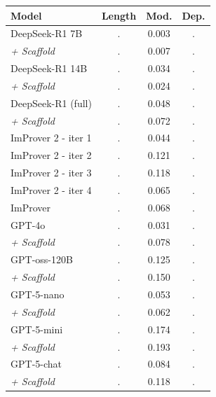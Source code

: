 \begin{tabular}{l|ccc}
\hline
\textbf{Model}  & \textbf{Length} & \textbf{Mod.} & \textbf{Dep.} \\
\hline
DeepSeek-R1 7B & . & 0.003 & . \\
\textit{+ Scaffold} & . & 0.007 & . \\
DeepSeek-R1 14B & . & 0.034 & . \\
\textit{+ Scaffold} & . & 0.024 & . \\
DeepSeek-R1 (full) & . & 0.048 & . \\
\textit{+ Scaffold} & . & 0.072 & . \\
\hdashline
ImProver 2 - iter 1 & . & 0.044 & . \\
ImProver 2 - iter 2 & . & 0.121 & . \\
ImProver 2 - iter 3 & . & 0.118 & . \\
ImProver 2 - iter 4 & . & 0.065 & . \\
\hdashline
ImProver & . & 0.068 & . \\
GPT-4o & . & 0.031 & . \\
\textit{+ Scaffold} & . & 0.078 & . \\
\hdashline
GPT-oss-120B & . & 0.125 & . \\
\textit{+ Scaffold} & . & 0.150 & . \\
GPT-5-nano & . & 0.053 & . \\
\textit{+ Scaffold} & . & 0.062 & . \\
GPT-5-mini & . & 0.174 & . \\
\textit{+ Scaffold} & . & 0.193 & . \\
GPT-5-chat & . & 0.084 & . \\
\textit{+ Scaffold} & . & 0.118 & . \\
\hline
\end{tabular}